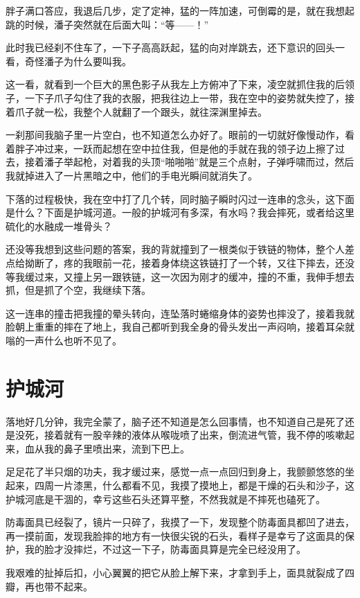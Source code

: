 胖子满口答应，我退后几步，定了定神，猛的一阵加速，可倒霉的是，就在我想起跳的时候，潘子突然就在后面大叫：“等——！”

此时我已经刹不住车了，一下子高高跃起，猛的向对岸跳去，还下意识的回头一看，奇怪潘子为什么要叫我。

这一看，就看到一个巨大的黑色影子从我左上方俯冲了下来，凌空就抓住我的后领子，一下子爪子勾住了我的衣服，把我往边上一带，我在空中的姿势就失控了，接着爪子就一松，我整个人就翻了一个跟头，就往深渊里掉去。

一刹那间我脑子里一片空白，也不知道怎么办好了。眼前的一切就好像慢动作，看着胖子冲过来，一跃而起想在空中拉住我，但是他的手就在我的领子边上擦了过去，接着潘子举起枪，对着我的头顶“啪啪啪”就是三个点射，子弹呼啸而过，然后我就掉进入了一片黑暗之中，他们的手电光瞬间就消失了。

下落的过程极快，我在空中打了几个转，同时脑子瞬时闪过一连串的念头，这下面是什么？下面是护城河道。一般的护城河有多深，有水吗？我会摔死，或者给这里硫化的水融成一堆骨头？

还没等我想到这些问题的答案，我的背就撞到了一根类似于铁链的物体，整个人差点给拗断了，疼的我眼前一花，接着身体绕这铁链打了一个转，又往下摔去，还没等我缓过来，又撞上另一跟铁链，这一次因为刚才的缓冲，撞的不重，我伸手想去抓，但是抓了个空，我继续下落。

这一连串的撞击把我撞的晕头转向，连坠落时蜷缩身体的姿势也摔没了，接着我就脸朝上重重的摔在了地上，我自己都听到我全身的骨头发出一声闷响，接着耳朵就嗡的一声什么也听不见了。

\chapter{护城河}

落地好几分钟，我完全蒙了，脑子还不知道是怎么回事情，也不知道自己是死了还是没死，接着就有一股辛辣的液体从喉咙喷了出来，倒流进气管，我不停的咳嗽起来，血从我的鼻子里喷出来，流到下巴上。

足足花了半只烟的功夫，我才缓过来，感觉一点一点回归到身上，我颤颤悠悠的坐起来，四周一片漆黑，什么都看不见，我摸了摸地上，都是干燥的石头和沙子，这护城河底是干涸的，幸亏这些石头还算平整，不然我就是不摔死也磕死了。

防毒面具已经裂了，镜片一只碎了，我摸了一下，发现整个防毒面具都凹了进去，再一摸前面，发现我脸摔的地方有一快很尖锐的石头，看样子是幸亏了这面具的保护，我的脸才没摔烂，不过这一下子，防毒面具算是完全已经没用了。

我艰难的扯掉后扣，小心翼翼的把它从脸上解下来，才拿到手上，面具就裂成了四瓣，再也带不起来。

